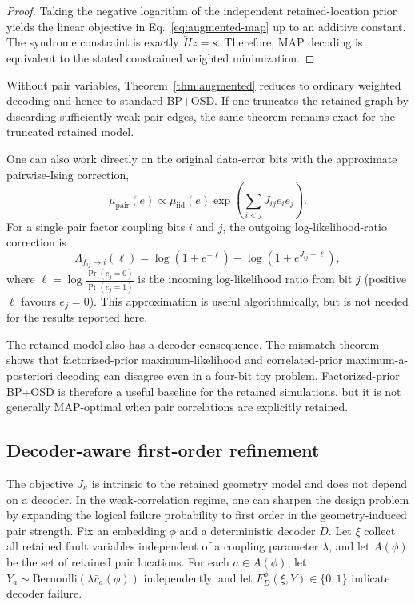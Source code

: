 \documentclass[
aps,
prx,
10pt,
twocolumn,
groupedaddress,
longbibliography,
nofootinbib,
floatfix
]{revtex4-2}
\theoremstyle{definition}
\begin{document}
\begin{proof}
Taking the negative logarithm of the independent retained-location prior yields the linear objective in Eq.~\eqref{eq:augmented-map} up to an additive constant. The syndrome constraint is exactly $\widetilde H z=s$. Therefore, MAP decoding is equivalent to the stated constrained weighted minimization.
\end{proof}

Without pair variables, Theorem~\ref{thm:augmented} reduces to ordinary weighted decoding and hence to standard BP+OSD. If one truncates the retained graph by discarding sufficiently weak pair edges, the same theorem remains exact for the truncated retained model.

One can also work directly on the original data-error bits with the approximate pairwise-Ising correction,
\begin{equation}
\mu_{\mathrm{pair}}(e)\propto \mu_{\mathrm{iid}}(e)\exp\left(\sum_{i<j}J_{ij}e_i e_j\right).
\end{equation}
For a single pair factor coupling bits $i$ and $j$, the outgoing log-likelihood-ratio correction is
\begin{equation}
\Lambda_{f_{ij}\to i}(\ell)=\log\left(1+e^{-\ell}\right)-\log\left(1+e^{J_{ij}-\ell}\right),
\end{equation}
where $\ell=\log\frac{\Pr(e_j=0)}{\Pr(e_j=1)}$ is the incoming log-likelihood ratio from bit $j$ (positive $\ell$ favours $e_j=0$). This approximation is useful algorithmically, but is not needed for the results reported here.

The retained model also has a decoder consequence. The mismatch theorem shows that factorized-prior maximum-likelihood and correlated-prior maximum-a-posteriori decoding can disagree even in a four-bit toy problem. Factorized-prior BP+OSD is therefore a useful baseline for the retained simulations, but it is not generally MAP-optimal when pair correlations are explicitly retained.

\subsection{Decoder-aware first-order refinement}

The objective $J_{\kappa}$ is intrinsic to the retained geometry model and does not depend on a decoder. In the weak-correlation regime, one can sharpen the design problem by expanding the logical failure probability to first order in the geometry-induced pair strength. Fix an embedding $\phi$ and a deterministic decoder $D$. Let $\xi$ collect all retained fault variables independent of a coupling parameter $\lambda$, and let $A(\phi)$ be the set of retained pair locations. For each $a\in A(\phi)$, let $Y_a\sim \mathrm{Bernoulli}(\lambda\bar v_a(\phi))$ independently, and let $F_D^{\phi}(\xi,Y)\in\{0,1\}$ indicate decoder failure.
\end{document}
